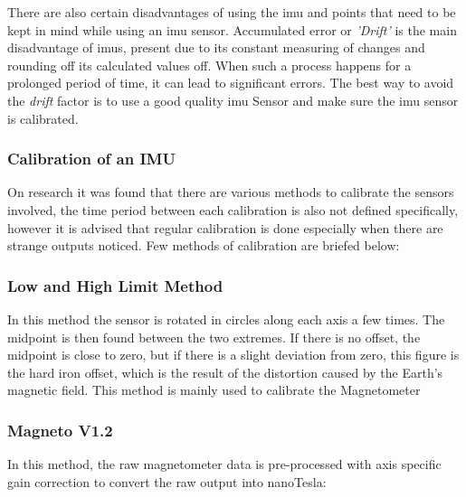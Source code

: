 There are also certain disadvantages of using the \ac{imu} and points that need to be kept in mind while using an \ac{imu} sensor. Accumulated error or \textit{'Drift'} is the main disadvantage of \ac{imu}s, present due to its constant measuring of changes and rounding off its calculated values off. When such a process happens for a prolonged period of time, it can lead to significant errors. The best way to avoid the \textit{drift} factor is to use a good quality \ac{imu} Sensor and make sure the \ac{imu} sensor is calibrated. \cite{STMicroelectronics:2015}

\subsubsection{Calibration of an IMU}


On research it was found that there are various methods to calibrate the sensors involved, the time period between each calibration is also not defined specifically, however it is advised that regular calibration is done especially when there are strange outputs noticed. Few methods of calibration are briefed below:

\subsubsection{Low and High Limit Method}

In this method the sensor is rotated in circles along each axis a few times. The midpoint is then found between the two extremes. If there is no offset, the midpoint is close to zero, but if there is a slight deviation from zero, this figure is the hard iron offset, which is the result of the distortion caused by the Earth's magnetic field. This method is mainly used to calibrate the Magnetometer \cite{Mallon:2015}

\subsubsection{Magneto V1.2}

In this method, the raw magnetometer data is pre-processed with axis specific gain correction to convert the raw output into nanoTesla: 

\begin{center} 
    
    
    
    
    
    
\end{center} 

